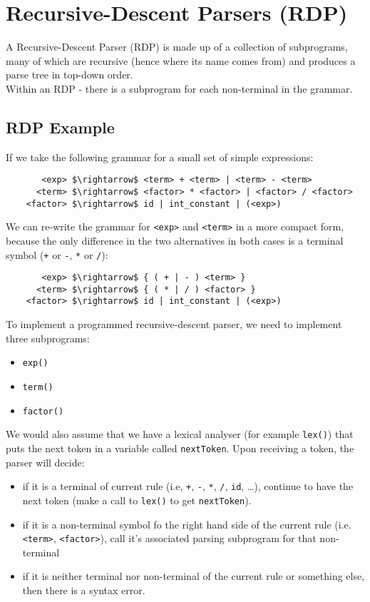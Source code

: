 \section{Recursive-Descent Parsers (RDP)}
A Recursive-Descent Parser (RDP) is made up of a collection of subprograms, many of which are recursive (hence where its name comes from) and produces a parse tree in top-down order.\\

Within an RDP - there is a subprogram for each non-terminal in the grammar. 

\subsection{RDP Example}
If we take the following grammar for a small set of simple expressions:
\begin{lstlisting}
       <exp> $\rightarrow$ <term> + <term> | <term> - <term>
      <term> $\rightarrow$ <factor> * <factor> | <factor> / <factor>
    <factor> $\rightarrow$ id | int_constant | (<exp>)
\end{lstlisting}

We can re-write the grammar for \verb|<exp>| and \verb|<term>| in a more compact form, because the only difference in the two alternatives in both cases is a terminal symbol (\verb|+| or \verb|-|, \verb|*| or \verb|/|):
\begin{lstlisting}
       <exp> $\rightarrow$ { ( + | - ) <term> }
      <term> $\rightarrow$ { ( * | / ) <factor> }
    <factor> $\rightarrow$ id | int_constant | (<exp>)
\end{lstlisting}

To implement a programmed recursive-descent parser, we need to implement three subprograms:
\begin{itemize}
    \item \verb|exp()|
    \item \verb|term()|
    \item \verb|factor()|
\end{itemize}
We would also assume that we have a lexical analyser (for example \verb|lex()|) that puts the next token in a variable called \verb|nextToken|. Upon receiving a token, the parser will decide:
\begin{itemize}
    \item if it is a terminal of current rule (i.e, \verb|+|, \verb|-|, \verb|*|, \verb|/|, \verb|id|, \ldots), continue to have the next token (make a call to \verb|lex()| to get \verb|nextToken|). 
    \item if it is a non-terminal symbol fo the right hand side of the current rule (i.e. \verb|<term>|, \verb|<factor>|), call it's associated parsing subprogram for that non-terminal
    \item if it is neither terminal nor non-terminal of the current rule or something else, then there is a syntax error.
\end{itemize}

